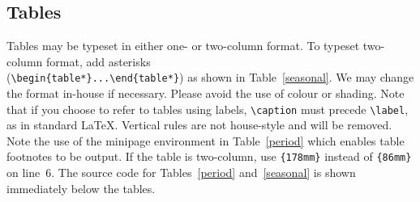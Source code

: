 \documentclass[review,oneside]{igs}
\begin{document}
\subsection{Tables}

Tables may be typeset in either one- or two-column format. To typeset two-column format, add asterisks\\
(\verb"\begin{table*}...\end{table*}") as shown in Table~\ref{seasonal}. We may change the format in-house if necessary. Please avoid the use of colour or shading. Note that if you choose to refer to tables using labels, \verb"\caption" must precede \verb"\label", as in standard \LaTeX. Vertical rules are not house-style and will be removed. Note the use of the minipage environment in Table~\ref{period} which enables table footnotes to be output. If the table is two-column, use \texttt{\{178mm\}} instead of \texttt{\{86mm\}} on line~6. The source code for Tables~\ref{period} and~\ref{seasonal} is shown immediately below the tables.
\end{document}
